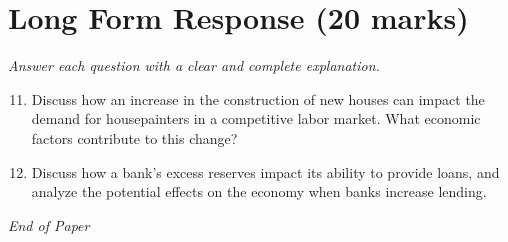 \documentclass[12pt]{article}
\begin{document}
\section*{Long Form Response (20 marks)}
\textit{Answer each question with a clear and complete explanation.}
\begin{enumerate}[label=\arabic*.]
\setcounter{enumi}{10}
\item Discuss how an increase in the construction of new houses can impact the demand for housepainters in a competitive labor market. What economic factors contribute to this change?
\item Discuss how a bank's excess reserves impact its ability to provide loans, and analyze the potential effects on the economy when banks increase lending.
\end{enumerate}

\vfill
\noindent\textit{End of Paper}
\end{document}
